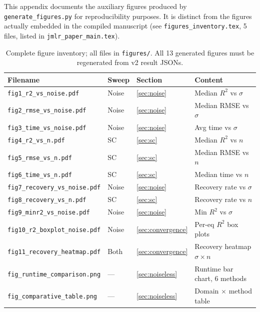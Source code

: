 \documentclass[twoside,11pt]{article}
\newcommand{\Rsq}{R^{2}}
\begin{document}
\noindent This appendix documents the auxiliary figures produced by
\texttt{generate\_figures.py} for reproducibility purposes. It is
distinct from the figures actually embedded in the compiled
manuscript (see \texttt{figures\_inventory.tex}, 5 files, listed in
\texttt{jmlr\_paper\_main.tex}).

\begin{table}[H]
\centering
\caption{Complete figure inventory; all files in \texttt{figures/}.
  All 13 generated figures must be regenerated from v2 result JSONs.}
\label{tab:figlist}
\small
\renewcommand{\arraystretch}{1.25}
\begin{tabular}{L{4.8cm} L{1.5cm} L{1.8cm} L{3.2cm}}
\toprule
\textbf{Filename} & \textbf{Sweep} & \textbf{Section} & \textbf{Content}\\
\midrule
\texttt{fig1\_r2\_vs\_noise.pdf}       & Noise & \ref{sec:noise}        & Median $\Rsq$ vs $\sigma$\\
\texttt{fig2\_rmse\_vs\_noise.pdf}     & Noise & \ref{sec:noise}        & Median RMSE vs $\sigma$\\
\texttt{fig3\_time\_vs\_noise.pdf}     & Noise & \ref{sec:noise}        & Avg time vs $\sigma$\\
\texttt{fig4\_r2\_vs\_n.pdf}           & SC    & \ref{sec:sc}           & Median $\Rsq$ vs $n$\\
\texttt{fig5\_rmse\_vs\_n.pdf}         & SC    & \ref{sec:sc}           & Median RMSE vs $n$\\
\texttt{fig6\_time\_vs\_n.pdf}         & SC    & \ref{sec:sc}           & Median time vs $n$\\
\texttt{fig7\_recovery\_vs\_noise.pdf} & Noise & \ref{sec:noise}        & Recovery rate vs $\sigma$\\
\texttt{fig8\_recovery\_vs\_n.pdf}     & SC    & \ref{sec:sc}           & Recovery rate vs $n$\\
\texttt{fig9\_minr2\_vs\_noise.pdf}    & Noise & \ref{sec:noise}        & Min $\Rsq$ vs $\sigma$\\
\texttt{fig10\_r2\_boxplot\_noise.pdf} & Noise & \ref{sec:convergence}  & Per-eq $\Rsq$ box plots\\
\texttt{fig11\_recovery\_heatmap.pdf}  & Both  & \ref{sec:convergence}  & Recovery heatmap $\sigma \times n$\\
\midrule
\texttt{fig\_runtime\_comparison.png}  & ---   & \ref{sec:noiseless}    & Runtime bar chart, 6 methods\\
\texttt{fig\_comparative\_table.png}   & ---   & \ref{sec:noiseless}    & Domain $\times$ method table\\
\bottomrule
\end{tabular}
\end{table}
\end{document}
